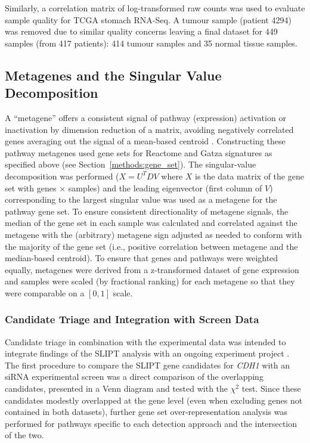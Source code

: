 Similarly, a correlation matrix of log-transformed raw counts was used to evaluate sample quality for \gls{TCGA} stomach \gls{RNA-Seq}. A tumour sample (patient 4294) was removed due to similar quality concerns leaving a final dataset for 449 samples (from 417 patients): 414 tumour samples and 35 normal tissue samples.

\subsection{Metagenes and the Singular Value Decomposition} \label{methods:metagene}
A ``\gls{metagene}'' offers a consistent signal of \gls{pathway} (expression) activation or inactivation by dimension reduction of a matrix, avoiding negatively correlated genes averaging out the signal of a mean-based centroid \citep{Huang2003}. Constructing these \gls{pathway} \glspl{metagene} used gene sets for Reactome and Gatza signatures \citep{Gatza2011, Gatza2014} as specified above (see Section~\ref{methods:gene_set}). The singular-value decomposition was performed ($X = U^{T} D V$ where $X$ is the data matrix of the gene set with genes $\times$ samples) and the leading eigenvector (first column of $V$) corresponding to the largest singular value was used as a \gls{metagene} for the \gls{pathway} gene set. To ensure consistent directionality of \gls{metagene} signals, the median of the gene set in each sample was calculated and correlated against the \gls{metagene} with the (arbitrary) \gls{metagene} sign adjusted as needed to conform with the majority of the gene set (i.e., positive correlation between \gls{metagene} and the median-based centroid). To ensure that genes and \glspl{pathway} were weighted equally, \glspl{metagene} were derived from a z-transformed dataset of \gls{gene expression} and samples were scaled (by fractional ranking) for each \gls{metagene} so that they were comparable on a $[0,1]$ scale. 

\subsubsection{Candidate Triage and Integration with Screen Data} \label{methods:venn_analysis}
Candidate triage in combination with the experimental data was intended to integrate findings of the \gls{SLIPT} analysis with an ongoing experiment project \citep{Chen2014, Telford2015}. The first procedure to compare the \gls{SLIPT} gene candidates for \textit{CDH1} with an \gls{siRNA} experimental screen \citep{Telford2015} was a direct comparison of the overlapping candidates, presented in a Venn diagram and tested with the $\chi^2$ test. Since these candidates modestly overlapped at the gene level (even when excluding genes not contained in both datasets), further gene set over-representation analysis was performed for pathways specific to each detection approach and the intersection of the two.

